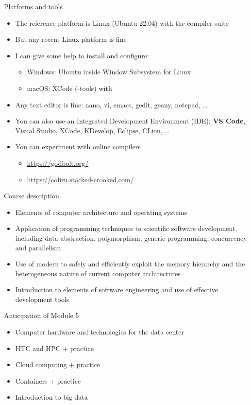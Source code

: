 \begin{frame}{Platforms and tools}
  \begin{itemize}[<+->]
  \item The reference platform is Linux (Ubuntu 22.04) with the 
    compiler suite
  \item But any recent Linux platform is fine
  \item I can give some help to install and configure:
    \begin{itemize}[<.->]
    \item Windows: Ubuntu inside Window Subsystem for Linux
    \item macOS: XCode (-tools) with 
    \end{itemize}
  \item Any text editor is fine: nano, vi, emacs, gedit, geany, notepad, \ldots
  \item You can also use an Integrated Development Environment (IDE): \textbf{VS
      Code}, Visual Studio, XCode, KDevelop, Eclipse, CLion, \ldots
  \item You can experiment with online compilers
    \begin{itemize}[<.->]
    \item \url{https://godbolt.org/}
    \item \url{https://coliru.stacked-crooked.com/}
    \end{itemize}
  \end{itemize}
\end{frame}

\begin{frame}{Course description}

  \begin{itemize}
  \item Elements of computer architecture and operating systems
  \item Application of \Cpp{} programming techniques to scientific software
    development, including data abstraction, polymorphism, generic programming,
    concurrency and parallelism
  \item Use of modern \Cpp{} to safely and efficiently exploit the memory
    hierarchy and the heterogeneous nature of current computer architectures
  \item Introduction to elements of software engineering and use of effective
    development tools
  \end{itemize}

\end{frame}

\begin{frame}{Anticipation of Module 5}

  \begin{itemize}
  \item Computer hardware and technologies for the data center
  \item HTC and HPC + practice
  \item Cloud computing + practice
  \item Containers + practice
  \item Introduction to big data
  \end{itemize}

\end{frame}
